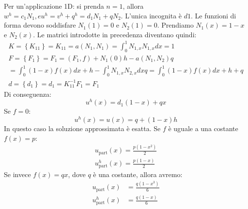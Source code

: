         Per un'applicazione 1D: si prenda $n=1$, allora
        $w^h=c_1N_1,eu^h=v^h+q^h = d_1N_1+qN_2$. L'unica incognita è $d1$. Le funzioni
        di forma devono soddisfare $N_1(1)=0$ e $N_2(1)=0$. Prendiamo $N_1(x)=1-x$ e $N_2(x)$.
        Le matrici introdotte in precedenza diventano quindi:
        \begin{equation}
            \begin{array}{c}
            K=\left\{K_{11}\right\}=K_{11}=a\left(N_{1}, N_{1}\right)=\int_{0}^{1} N_{1, x} N_{1, x} d x=1 \\
            F=\left\{F_{1}\right\}=F_{1}=\left(F_{1}, f\right)+N_{1}(0) h-a\left(N_{1}, N_{2}\right) q \\
            =\int_{0}^{1}(1-x) f(x) d x+h-\int_{0}^{1} N_{1, x} N_{2, x} d x q=\int_{0}^{1}(1-x) f(x) d x+h+q \\
            d=\left\{d_{1}\right\}=d_{1}=K_{11}^{-1} F_{1}=F_{1}
            \end{array}
        \end{equation}
        Di conseguenza:
        \begin{equation}
            u^{h}(x)=d_{1}(1-x)+q x
        \end{equation}
        Se $f=0$:
        \begin{equation}
            u^{h}(x)=u(x)=q+(1-x) h
        \end{equation}
        In questo caso la soluzione approssimata è esatta.
        Se $f$ è uguale a una costante $f(x)=p$:
        \begin{equation}
            \begin{array}{l}
            u_{\text {part}}(x)=\frac{p\left(1-x^{2}\right)}{2} \\
            u_{\text {part}}^{h}(x)=\frac{p(1-x)}{2}
            \end{array}
        \end{equation}
        Se invece $f(x)=qx$, dove $q$ è una costante, allora avremo:
        \begin{equation}
            \begin{aligned}
            u_{\text {part}}(x) &=\frac{q\left(1-x^{3}\right)}{6} \\
            u_{\text {part}}^{h}(x) &=\frac{q(1-x)}{6}
            \end{aligned}
        \end{equation}

